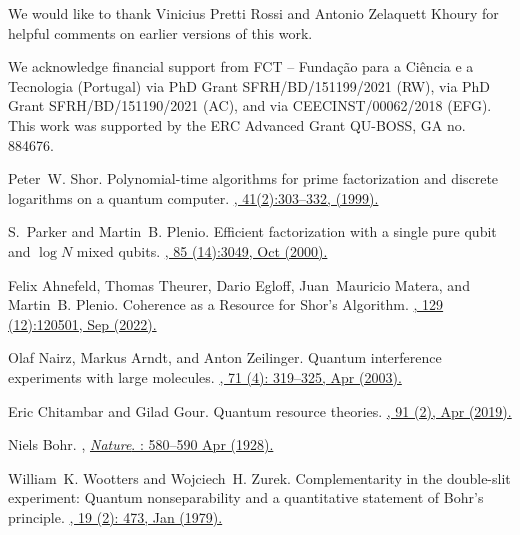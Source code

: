 \documentclass[a4paper,twocolumn,11pt,accepted=2024-01-17]{quantumarticle}
\begin{document}
We would like to thank Vinicius Pretti Rossi and Antonio Zelaquett Khoury for helpful comments on earlier versions of this work.

We acknowledge financial support from FCT -- Fundação para a Ciência e a Tecnologia (Portugal) via PhD Grant SFRH/BD/151199/2021 (RW), via PhD Grant SFRH/BD/151190/2021 (AC), and via CEECINST/00062/2018 (EFG). This work was supported by the ERC Advanced Grant QU-BOSS, GA no. 884676.




\begin{thebibliography}{100}



Peter~W. Shor.
\newblock Polynomial-time algorithms for prime factorization and discrete
  logarithms on a quantum computer.
\href{https://doi.org/10.1137/S0036144598347011}{, 41(2):303--332, (1999).}

S.~Parker and Martin~B. Plenio.
\newblock Efficient factorization with a single pure qubit and $\log N$ mixed
  qubits.
\href{https://doi.org/10.1103/PhysRevLett.85.3049}{, 85 (14):3049, Oct (2000).}

Felix Ahnefeld, Thomas Theurer, Dario Egloff, Juan~Mauricio Matera, and
  Martin~B. Plenio.
\newblock Coherence as a {R}esource for {S}hor's {A}lgorithm.
\href{https://doi.org/10.1103/PhysRevLett.129.120501}{, 129 (12):120501, Sep (2022).}

Olaf Nairz, Markus Arndt, and Anton Zeilinger.
\newblock Quantum interference experiments with large molecules.
\href{https://doi.org/10.1119/1.1531580}{, 71 (4): 319--325, Apr (2003).}

Eric Chitambar and Gilad Gour.
\newblock Quantum resource theories.
\href{https://doi.org/10.1103/RevModPhys.91.025001}{, 91 (2), Apr (2019).}

Niels Bohr.
, \href{https://doi.org/10.1038/121580a0}{\emph{Nature}.
: 580--590 Apr (1928).}

William~K. Wootters and Wojciech~H. Zurek.
\newblock Complementarity in the double-slit experiment: Quantum
  nonseparability and a quantitative statement of {B}ohr's principle.
\href{https://doi.org/10.1103/PhysRevD.19.473}{, 19 (2): 473, Jan (1979).}


\end{thebibliography}
\end{document}

